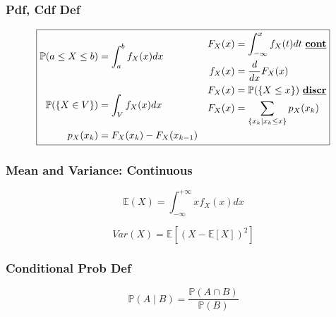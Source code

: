 \documentclass[10pt]{article}
\begin{document}
\begin{multicols}{2}
\subsubsection*{Pdf, Cdf Def}

\begin{equation*}
  \boxed{
    \begin{aligned}
      \mathbb{P}(a\leq X\leq b) &= \int_a^b f_X(x)dx  &&
      \begin{aligned}
        F_X(x) &= \int_{-\infty}^x f_X(t)dt \text{ \underline{\textbf{cont}}} \\
        f_X(x) &= \frac{d}{dx} F_X(x)
      \end{aligned} \\
      \mathbb{P}(\{X\in V\}) &= \int_V f_X(x)dx &&
      \begin{aligned}
        F_X(x) &= \mathbb{P}(\{X\leq x\}) \text{ \underline{\textbf{discr}}} \\
        F_X(x) &= \sum_{\{x_k \mid x_k \leq x\}} p_X(x_k)
      \end{aligned} \\
      p_X(x_k) &= F_X(x_k) - F_X(x_{k-1})
    \end{aligned}
  }
\end{equation*}


\columnbreak
\subsubsection*{\qquad Mean and Variance: Continuous}
\begin{equation*}
  \boxed{
    \mathbb{E}(X) = \int_{-\infty}^{+\infty} xf_X(x)dx
  }
\end{equation*}

\begin{equation*}
  \boxed{
    Var(X) = \mathbb{E}[(X - \mathbb{E}[X])^2]
  }
\end{equation*}

\subsubsection*{\qquad Conditional Prob Def}

\begin{equation*}
  \boxed{
    \mathbb{P}(A \mid B) = \frac{\mathbb{P}(A \cap B)}{\mathbb{P}(B)}
  }
\end{equation*}

\end{multicols}
\end{document}
